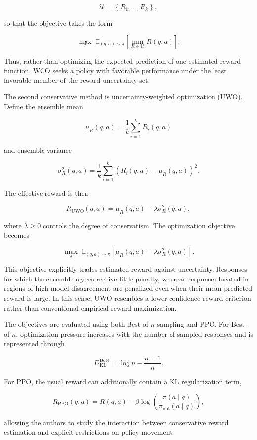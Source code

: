 \documentclass[11pt]{article}
\begin{document}
\[
\mathcal{U}
=
\left\{
R_1,\ldots,R_k
\right\},
\]

so that the objective takes the form

\[
\max_{\pi}
\;
\mathbb{E}_{(q,a)\sim\pi}
\left[
\min_{R\in\mathcal{U}}
R(q,a)
\right].
\]

Thus, rather than optimizing the expected prediction of one estimated reward function, WCO seeks a policy with favorable performance under the least favorable member of the reward uncertainty set.

The second conservative method is uncertainty-weighted optimization (UWO). Define the ensemble mean

\[
\mu_R(q,a)
=
\frac{1}{k}
\sum_{i=1}^{k}
R_i(q,a)
\]

and ensemble variance

\[
\sigma_R^2(q,a)
=
\frac{1}{k}
\sum_{i=1}^{k}
\left(
R_i(q,a)-\mu_R(q,a)
\right)^2.
\]

The effective reward is then

\[
R_{\mathrm{UWO}}(q,a)
=
\mu_R(q,a)
-
\lambda
\sigma_R^2(q,a),
\]

where $\lambda\geq 0$ controls the degree of conservatism. The optimization objective becomes

\[
\max_{\pi}
\;
\mathbb{E}_{(q,a)\sim\pi}
\left[
\mu_R(q,a)
-
\lambda\sigma_R^2(q,a)
\right].
\]

This objective explicitly trades estimated reward against uncertainty. Responses for which the ensemble agrees receive little penalty, whereas responses located in regions of high model disagreement are penalized even when their mean predicted reward is large. In this sense, UWO resembles a lower-confidence reward criterion rather than conventional empirical reward maximization.

The objectives are evaluated using both Best-of-$n$ sampling and PPO. For Best-of-$n$, optimization pressure increases with the number of sampled responses and is represented through

\[
D_{\mathrm{KL}}^{\mathrm{BoN}}
=
\log n
-
\frac{n-1}{n}.
\]

For PPO, the usual reward can additionally contain a KL regularization term,

\[
R_{\mathrm{PPO}}(q,a)
=
R(q,a)
-
\beta
\log
\left(
\frac{\pi(a\mid q)}
{\pi_{\mathrm{init}}(a\mid q)}
\right),
\]

allowing the authors to study the interaction between conservative reward estimation and explicit restrictions on policy movement.
\end{document}
